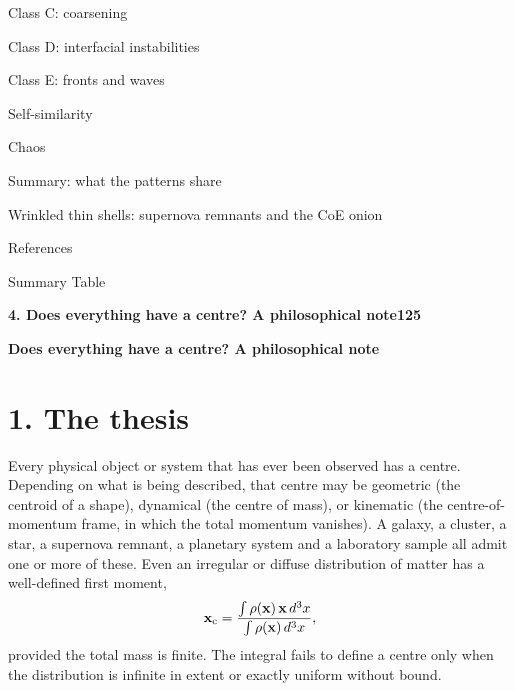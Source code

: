 \documentclass[11pt,a4paper]{article}
\begin{document}
{\noindent\hspace*{1.2em}Class C: coarsening\par
\noindent\hspace*{1.2em}Class D: interfacial instabilities\par
\noindent\hspace*{1.2em}Class E: fronts and waves\par
\noindent\hspace*{1.2em}Self-similarity\par
\noindent\hspace*{1.2em}Chaos\par
\noindent\hspace*{1.2em}Summary: what the patterns share\par
\noindent\hspace*{1.2em}Wrinkled thin shells: supernova remnants and the CoE onion\par
\noindent\hspace*{1.2em}References\par
\noindent\hspace*{1.2em}Summary Table\par
\noindent\textbf{4. Does everything have a centre? A philosophical note}\dotfill\textbf{125}\par\smallskip
}
\clearpage



\pagestyle{plain}
\begin{center}{\Large\bfseries Does everything have a centre? A philosophical note\par}\end{center}
\section*{1. The thesis}
Every physical object or system that has ever been observed has a centre. Depending on what is being described, that centre may be geometric (the centroid of a shape), dynamical (the centre of mass), or kinematic (the centre-of-momentum frame, in which the total momentum vanishes). A galaxy, a cluster, a star, a supernova remnant, a planetary system and a laboratory sample all admit one or more of these. Even an irregular or diffuse distribution of matter has a well-defined first moment,
\begin{equation}
\mathbf{x}_{\rm c}=\frac{\int\rho(\mathbf{x})\,\mathbf{x}\,d^3x}{\int\rho(\mathbf{x})\,d^3x},
\end{equation}
provided the total mass is finite. The integral fails to define a centre only when the distribution is infinite in extent or exactly uniform without bound.
\end{document}
